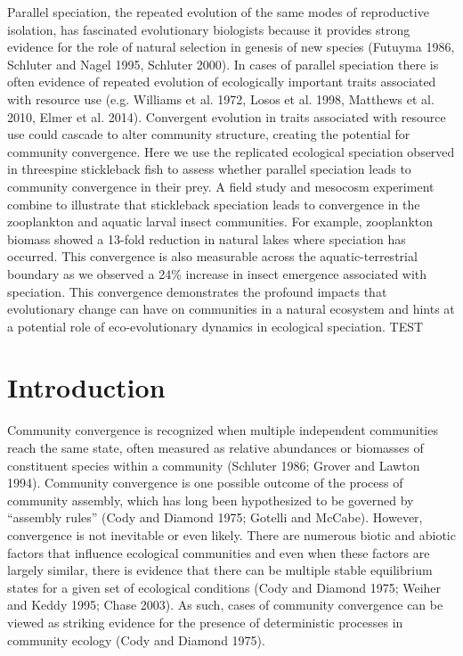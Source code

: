 \documentclass[11pt]{article}
\begin{document}
Parallel speciation, the repeated evolution of the same modes of reproductive isolation, has fascinated evolutionary biologists because it provides strong evidence for the role of natural selection in genesis of new species (Futuyma 1986, Schluter and Nagel 1995, Schluter 2000).  In cases of parallel speciation there is often evidence of repeated evolution of ecologically important traits associated with resource use (e.g. Williams et al. 1972, Losos et al. 1998, Matthews et al. 2010, Elmer et al. 2014).  Convergent evolution in traits associated with resource use could cascade to alter community structure, creating the potential for community convergence.  Here we use the replicated ecological speciation observed in threespine stickleback fish to assess whether parallel speciation leads to community convergence in their prey.  A field study and mesocosm experiment combine to illustrate that stickleback speciation leads to convergence in the zooplankton and aquatic larval insect communities.  For example, zooplankton biomass showed a 13-fold reduction in natural lakes where speciation has occurred.  This convergence is also measurable across the aquatic-terrestrial boundary as we observed a 24\% increase in insect emergence associated with speciation.  This convergence demonstrates the profound impacts that evolutionary change can have on communities in a natural ecosystem and hints at a potential role of eco-evolutionary dynamics in ecological speciation. TEST

\newpage{}

\section*{Introduction}


Community convergence is recognized when multiple independent communities reach the same state, often measured as relative abundances or biomasses of constituent species within a community (Schluter 1986; Grover and Lawton 1994).  Community convergence is one possible outcome of the process of community assembly, which has long been hypothesized to be governed by “assembly rules” (Cody and Diamond 1975; Gotelli and McCabe).  However, convergence is not inevitable or even likely.  There are numerous biotic and abiotic factors that influence ecological communities and even when these factors are largely similar, there is evidence that there can be multiple stable equilibrium states for a given set of ecological conditions (Cody and Diamond 1975; Weiher and Keddy 1995; Chase 2003).  As such, cases of community convergence can be viewed as striking evidence for the presence of deterministic processes in community ecology (Cody and Diamond 1975).  
\end{document}
